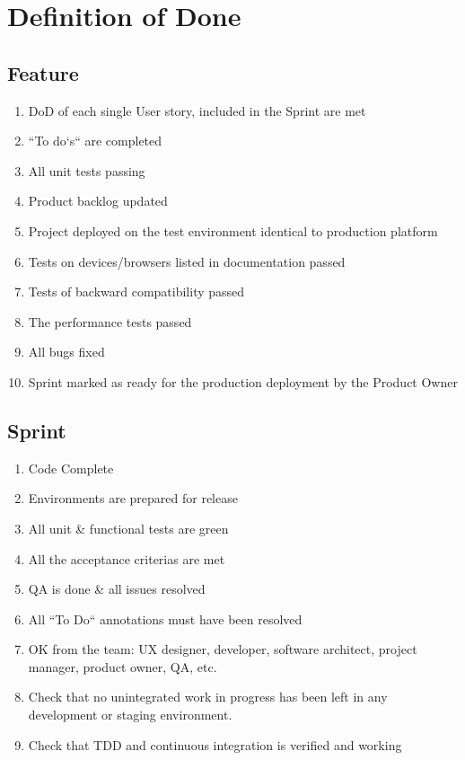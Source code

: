 \section{Definition of Done}
\subsection{Feature}
\begin{enumerate}
	\item DoD of each single User story, included in the Sprint are met
	\item ``To do`s`` are completed
	\item All unit tests passing
	\item Product backlog updated
	\item Project deployed on the test environment identical to production platform
	\item Tests on devices/browsers listed in documentation passed
	\item Tests of backward compatibility passed
	\item The performance tests passed
	\item All bugs fixed
	\item Sprint marked as ready for the production deployment by the Product Owner
\end{enumerate}

\subsection{Sprint}
\begin{enumerate}
	\item Code Complete
	\item Environments are prepared for release
	\item All unit \& functional tests are green
	\item All the acceptance criterias are met
	\item QA is done \& all issues resolved
	\item All ``To Do`` annotations must have been resolved
	\item OK from the team: UX designer, developer, software architect, project manager, product owner, QA, etc.
	\item Check that no unintegrated work in progress has been left in any development or staging environment.
	\item Check that TDD and continuous integration is verified and working
\end{enumerate}
